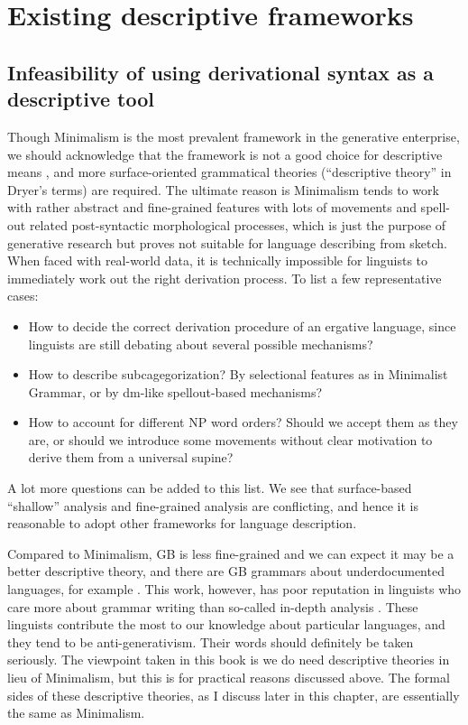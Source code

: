 \documentclass[../main.tex]{subfiles}
\begin{document}
\section{Existing descriptive frameworks}\label{sec:descriptive-framework}

\subsection{Infeasibility of using derivational syntax as a descriptive tool}\label{sec:generative-no-good}

Though Minimalism is the most prevalent framework in the generative enterprise, 
we should acknowledge that the framework is not a good choice for descriptive means \citep{dryer2006descriptive}, 
and more surface-oriented grammatical theories (``descriptive theory'' in Dryer's terms) are required. 
The ultimate reason is Minimalism tends to work with rather abstract and fine-grained features 
with lots of movements and spell-out related post-syntactic morphological processes, 
which is just the purpose of generative research but proves not suitable for language describing from sketch.
When faced with real-world data, 
it is technically impossible for linguists to immediately work out the right derivation process. 
To list a few representative cases:
\begin{itemize}
    \item  How to decide the correct derivation procedure of an ergative language, since 
    linguists are still debating about several possible mechanisms?
    \item How to describe subcagegorization? By selectional features as in Minimalist Grammar,
    or by \ac{dm}-like spellout-based mechanisms\citep{siddiqi2009syntax}?
    \item How to account for different NP word orders? Should we accept them as they are, or should we introduce 
    some movements without clear motivation \citep{cinque2005deriving} to derive them from a universal supine?
\end{itemize}
A lot more questions can be added to this list. We see that surface-based ``shallow'' analysis and fine-grained 
analysis are conflicting, and hence it is reasonable to adopt other frameworks for language description.

Compared to Minimalism, GB is less fine-grained and we can expect it may be a better descriptive theory,
and there are GB grammars about underdocumented languages, for example \citet{holmer1996parametric}. 
This work, however, has poor reputation in linguists 
who care more about grammar writing than so-called in-depth analysis \citep{van2007holistic}.
These linguists contribute the most to our knowledge about particular languages, 
and they tend to be anti-generativism. Their words should definitely be taken seriously.
The viewpoint taken in this book is we do need descriptive theories in lieu of Minimalism,
but this is for practical reasons discussed above.
The formal sides of these descriptive theories, as I discuss later in this chapter, 
are essentially the same as Minimalism.
\end{document}
